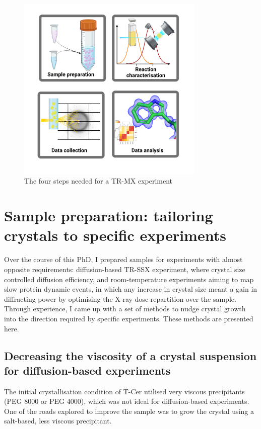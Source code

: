\begin{figure}[H]
    \centering
    \includegraphics[width=0.8\textwidth]{images/Introduction/TR-MX_diagram.pdf}
    \caption{The four steps needed for a TR-MX experiment}
    \label{fig:diagram}
\end{figure}

\section{Sample preparation: tailoring crystals to specific experiments}

Over the course of this PhD, I prepared samples for experiments with almost opposite requirements: diffusion-based TR-SSX experiment, where crystal size controlled diffusion efficiency, and room-temperature experiments aiming to map slow protein dynamic events, in which any increase in crystal size meant a gain in diffracting power by optimising the X-ray dose repartition over the sample. Through experience, I came up with a set of methods to nudge crystal growth into the direction required by specific experiments. These methods are presented here. 

\subsection{Decreasing the viscosity of a crystal suspension for diffusion-based experiments}
The initial crystallisation condition of T-Cer utilised very viscous precipitants (PEG 8000 or PEG 4000), which was not ideal for diffusion-based experiments. One of the roads explored to improve the sample was to grow the crystal using a salt-based, less viscous precipitant. 


